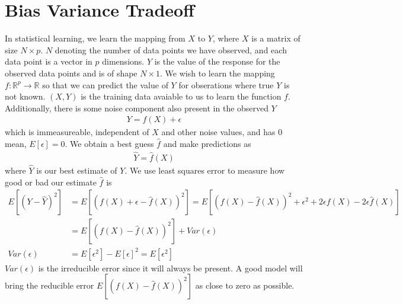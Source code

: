 \documentclass[../../statistical_learning_notes.tex]{subfiles}
\begin{document}
\section{Bias Variance Tradeoff}
In statistical learning, we learn the mapping from $X$ to $Y$, where $X$ is a matrix of size $N \times p$. $N$ denoting the number of data points we have observed, and each data point is a vector in $p$ dimensions. $Y$ is the value of the response for the observed data points and is of shape $N \times 1$. We wish to learn the mapping $f:\mathbb{R}^{p} \rightarrow \mathbb{R}$ so that we can predict the value of $Y$ for obserations where true $Y$ is not known. $(X, Y)$ is the training data avaiable to us to learn the function $f$. Additionally, there is some noise component also present in the observed $Y$
\begin{align*}
    Y = f(X) + \epsilon
\end{align*}
which is immeasureable, independent of $X$ and other noise values, and has $0$ mean, $E[\epsilon] = 0$. We obtain a best guess $\hat{f}$ and make predictions as
\begin{align*}
    \hat{Y} = \hat{f}(X)
\end{align*}
where $\hat{Y}$ is our best estimate of $Y$. We use least squares error to measure how good or bad our estimate $\hat{f}$ is
\begin{align*}
    E[(Y - \hat{Y})^{2}] &= E[(f(X) + \epsilon - \hat{f}(X))^{2}] = E[(f(X) - \hat{f}(X))^{2} + \epsilon^{2} + 2\epsilon f(X) - 2\epsilon \hat{f}(X)]\\
    &= E[(f(X) - \hat{f}(X))^{2}] + Var(\epsilon)\\
    Var(\epsilon) &= E[\epsilon^{2}] - E[\epsilon]^{2} = E[\epsilon^{2}]
\end{align*}
$Var(\epsilon)$ is the irreducible error since it will always be present. A good model will bring the reducible error $E[(f(X) - \hat{f}(X))^{2}]$ as close to zero as possible.\newline
\end{document}
